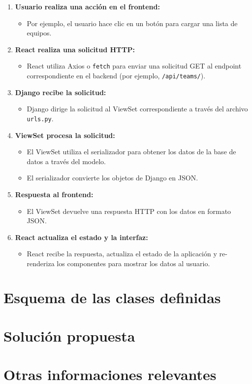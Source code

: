 \documentclass{report}
\begin{document}
    \begin{enumerate}
        \item \textbf{Usuario realiza una acción en el frontend:}
        \begin{itemize}
            \item Por ejemplo, el usuario hace clic en un botón para cargar una lista de equipos.
        \end{itemize}
        \item \textbf{React realiza una solicitud HTTP:}
        \begin{itemize}
            \item React utiliza Axios o \texttt{fetch} para enviar una solicitud GET al endpoint correspondiente en el backend (por ejemplo, \texttt{/api/teams/}).
        \end{itemize}
        \item \textbf{Django recibe la solicitud:}
        \begin{itemize}
            \item Django dirige la solicitud al ViewSet correspondiente a través del archivo \texttt{urls.py}.
        \end{itemize}
        \item \textbf{ViewSet procesa la solicitud:}
        \begin{itemize}
            \item El ViewSet utiliza el serializador para obtener los datos de la base de datos a través del modelo.
            \item El serializador convierte los objetos de Django en JSON.
        \end{itemize}
        \item \textbf{Respuesta al frontend:}
        \begin{itemize}
            \item El ViewSet devuelve una respuesta HTTP con los datos en formato JSON.
        \end{itemize}
        \item \textbf{React actualiza el estado y la interfaz:}
        \begin{itemize}
            \item React recibe la respuesta, actualiza el estado de la aplicación y re-renderiza los componentes para mostrar los datos al usuario.
        \end{itemize}
    \end{enumerate}
    \section*{Esquema de las clases definidas}

    \section*{Solución propuesta}

    \section*{Otras informaciones relevantes}
\end{document}
